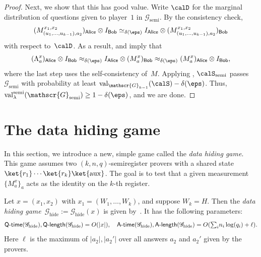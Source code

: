\documentclass[11pt]{article}
\newcommand{\consistency}{\simeq}
\newcommand{\hideq}{H}
\newcommand{\register}{\lambda}
\newcommand{\game}{\mathscr{G}}
\newcommand{\valstrat}[2]{\mathrm{val}_{#1}(#2)}
\newcommand{\valsemi}[2]{\mathrm{val}_{#1}^{\mathrm{semi}}(#2)}
\newcommand{\reg}[1]{{\mathsf{#1}}}
\newcommand{\qtime}[1]{\mathsf{Q}\textnormal{-}\mathsf{time}(#1)}
\newcommand{\atime}[1]{\mathsf{A}\textnormal{-}\mathsf{time}(#1)}
\newcommand{\qlength}[1]{\mathsf{Q}\textnormal{-}\mathsf{length}(#1)}
\newcommand{\alength}[1]{\mathsf{A}\textnormal{-}\mathsf{length}(#1)}
\begin{document}
\begin{proof}
Next, we show that this has good value.
Write $\calD$ for the marginal distribution of questions given to player~$1$ in $\game_{\mathrm{semi}}$.
By the consistency check,
\begin{equation*}
(M_{(u_1, \ldots, u_{k-1}),a_2}^{x_1, x_2})_{\reg{Alice}} \otimes I_{\reg{Bob}}
\consistency_{\delta(\eps)} I_{\reg{Alice}} \otimes (M_{(u_1, \ldots, u_{k-1}),a_2}^{x_1, x_2})_{\reg{Bob}}
\end{equation*}
with respect to~$\calD$.
As a result,  and  imply that
\begin{equation*}
(\Lambda_a^x)_{\reg{Alice}} \otimes I_{\reg{Bob}}
\approx_{\delta(\eps)} I_{\reg{Alice}} \otimes (M_a^x)_{\reg{Bob}}
\approx_{\delta(\eps)} (M_a^x)_{\reg{Alice}} \otimes I_{\reg{Bob}},
\end{equation*}
where the last step uses the self-consistency of~$M$.
Applying , $\calS_{\mathrm{semi}}$ passes $\game_{\mathrm{semi}}$ with probability at least $\valstrat{\game_{k-1}}{\calS} - \delta(\eps)$.  
Thus, $\valsemi{\register}{\game_{\mathrm{semi}}} \geq 1 - \delta(\eps)$, and we are done.
\end{proof}



\def\bpm#1\epm{}

\section{The data hiding game}\label{sec:data-hiding-layer}

In this section, we introduce a new, simple game called the \emph{data hiding game}.
This game assumes two $(k,n,q)$-semiregister provers with a shared state $\ket{r_1} \cdots \ket{r_k} \ket{\mathrm{aux}}$.
The goal is to test that a given measurement $\{M_a^x\}_a$ acts as the identity on the $k$-th register.

\begin{definition}\label{def:data-hide-def}
Let $x = (x_1, x_2)$ with $x_1 = (W_1, \ldots, W_k)$, and suppose $W_k = \hideq$.
Then the \emph{data hiding game}~$\game_{\mathrm{hide}} := \game_{\mathrm{hide}}(x)$ is given by~.
It has the following parameters:
\begin{equation*}
\qtime{\game_{\mathrm{hide}}},
\qlength{\game_{\mathrm{hide}}} = O(|x|),
\quad
\atime{\game_{\mathrm{hide}}},
\alength{\game_{\mathrm{hide}}} = O(\textstyle{\sum_i} n_i \log(q_i) + \ell).
\end{equation*}
Here $\ell$ is the maximum of $|a_2|, |a_2'|$ over all answers $a_2$ and $a_2'$ given by the provers.
\end{definition}
\end{document}
